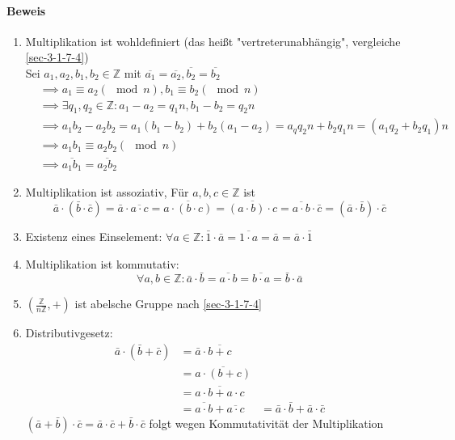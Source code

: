 \documentclass[a4paper]{scrartcl}
\DeclareMathOperator{\Forall}{\forall}
\theoremstyle{definition}
\theoremstyle{plain}
\theoremstyle{plain}
\theoremstyle{remark}
\theoremstyle{remark}
\theoremstyle{remark}
\theoremstyle{remark}
\theoremstyle{remark}
\begin{document}
\paragraph{Beweis}
\label{sec-3-2-4-1}
\begin{enumerate}
\item Multiplikation ist wohldefiniert (das heißt "vertreterunabhängig", vergleiche \ref{sec-3-1-7-4}) \\
                Sei $a_1,a_2,b_1,b_2 \in\mathbb{Z}$ mit $\overline{a_1} = \overline{a_2},\overline{b_2} = \overline{b_2}$
\begin{align}
&\implies a_1 \equiv a_2 (\mod n), b_1\equiv b_2 (\mod n) \\
&\implies \exists q_1,q_2\in\mathbb{Z}:a_1 - a_2 = q_1 n, b_1 - b_2 = q_2 n \\
&\implies a_1 b_2 - a_2 b_2 = a_1(b_1 - b_2) + b_2 (a_1 - a_2) = a_q q_2 n + b_2 q_1 n = (a_1 q_2 + b_2 q_1) n \\
&\implies a_1 b_1 \equiv a_2 b_2 (\mod n) \\
&\implies \overline{a_1 b_1} = \overline{a_2 b_2}
\end{align}
\item Multiplikation ist assoziativ, Für $a,b,c\in\mathbb{Z}$ ist
\[\bar a\cdot (\bar b\cdot \bar c) = \bar a \cdot \overline{a\cdot c} = \overline{a\cdot(b\cdot c)} = \overline{(a\cdot b)\cdot c} = \overline{a\cdot b} \cdot \bar c = (\bar a\cdot \bar b) \cdot \bar c\]
\item Existenz eines Einselement: $\Forall a\in\mathbb{Z}:\bar 1 \cdot \bar a = \overline{1\cdot a} = \bar a = \bar a\cdot \bar 1$
\item Multiplikation ist kommutativ:
\[\Forall a,b\in\mathbb{Z}:\bar a\cdot \bar b = \overline{a\cdot b} = \overline{b\cdot a} = \bar b \cdot \bar a\]
\item $(\frac{\mathbb{Z}}{n\mathbb{Z}},+)$ ist abelsche Gruppe nach \ref{sec-3-1-7-4}
\item Distributivgesetz:
\begin{align}
\bar a\cdot (\bar b + \bar c) &= \bar a \cdot \overline{b + c} \\
&= \overline{a\cdot (b + c)} \\
&= \overline{a\cdot b + a\cdot c} \\
&= \overline{a\cdot b} + \overline{a\cdot c}
&= \bar a\cdot \bar b + \bar a \cdot\bar c
\end{align}
$(\bar a + \bar b)\cdot \bar c = \bar a\cdot \bar c + \bar b \cdot \bar c$ folgt wegen Kommutativität der Multiplikation
\end{enumerate}
\end{document}
